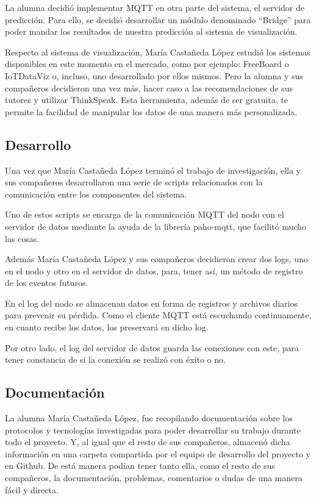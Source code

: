 La alumna decidió implementar MQTT en otra parte del sistema, el servidor de predicción. Para ello, se decidió desarrollar un módulo denominado ``Bridge'' para poder mandar los resultados de nuestra predicción al sistema de visualización.

Respecto al sistema de visualización, María Castañeda López estudió los sistemas disponibles en este momento en el mercado, como por ejemplo: FreeBoard o IoTDataViz o, incluso, uno desarrollado por ellos mismos. Pero la alumna y sus compañeros decidieron una vez más, hacer caso a las recomendaciones de sus tutores y utilizar ThinkSpeak. Esta herramienta, además de ser gratuita, te permite la facilidad de manipular los datos de una manera más personalizada. 

\subsection{Desarrollo}
Una vez que María Castañeda López terminó el trabajo de investigación, ella y sus compañeros desarrollaron una serie de scripts relacionados con la comunicación entre los componentes del sistema.

Uno de estos scripts se encarga de la comunicación MQTT del nodo con el servidor de datos mediante la ayuda de la librería paho-mqtt, que facilitó mucho las cosas.

Además María Castañeda López y sus compañeros decidieron crear dos logs, uno en el nodo y otro en el servidor de datos, para, tener así, un método de registro de los eventos futuros.

En el log del nodo se almacenan datos en forma de registros y archivos diarios para prevenir su pérdida. Como el cliente MQTT está escuchando continuamente, en cuanto recibe los datos, los preservará en dicho log.

Por otro lado, el log del servidor de datos guarda las conexiones con este, para tener constancia de si la conexión se realizó con éxito o no.

\subsection{Documentación}

La alumna María Castañeda López, fue recopilando documentación sobre los protocolos y tecnologías investigadas para poder desarrollar su trabajo durante todo el proyecto. Y, al igual que el resto de sus compañeros, almacenó dicha información en una carpeta compartida por el equipo de desarrollo del proyecto y en Github. De está manera podían tener tanto ella, como el resto de sus compañeros, la documentación, problemas, comentarios o dudas de una manera fácil y directa.

